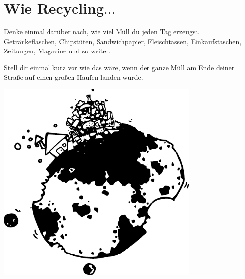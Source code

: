 

\chapter{Wie
Recycling\texorpdfstring{$\ldots$}{...}}\label{ch:sortoflikerecycling}

Denke einmal darüber nach, wie viel Müll du jeden Tag erzeugst. Getränkeflaschen, Chipstüten, Sandwichpapier, Fleischtassen, Einkaufstaschen, Zeitungen, Magazine und so weiter.
\par
Stell dir einmal kurz vor wie das wäre, wenn der ganze Müll am Ende deiner Straße auf einen großen Haufen landen würde.

\begin{center}
\includegraphics*[width=100mm]{images/trash}
\end{center}

